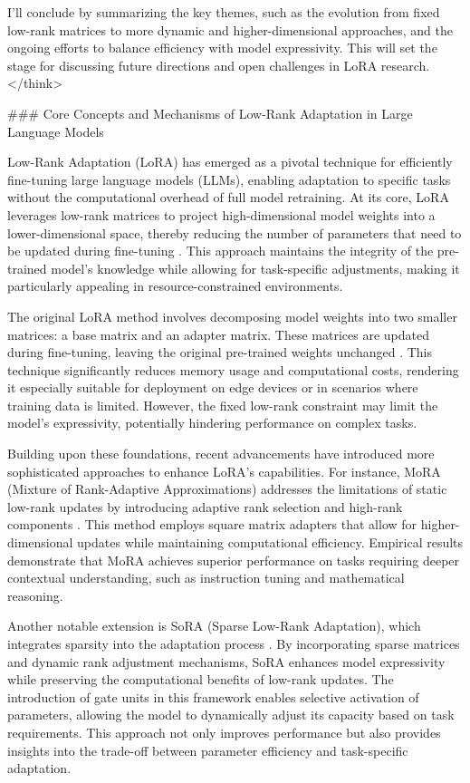 \documentclass[conference]{IEEEtran}
\begin{document}
I'll conclude by summarizing the key themes, such as the evolution from fixed low-rank matrices to more dynamic and higher-dimensional approaches, and the ongoing efforts to balance efficiency with model expressivity. This will set the stage for discussing future directions and open challenges in LoRA research.
</think>

### Core Concepts and Mechanisms of Low-Rank Adaptation in Large Language Models

Low-Rank Adaptation (LoRA) has emerged as a pivotal technique for efficiently fine-tuning large language models (LLMs), enabling adaptation to specific tasks without the computational overhead of full model retraining. At its core, LoRA leverages low-rank matrices to project high-dimensional model weights into a lower-dimensional space, thereby reducing the number of parameters that need to be updated during fine-tuning \cite{b1}. This approach maintains the integrity of the pre-trained model's knowledge while allowing for task-specific adjustments, making it particularly appealing in resource-constrained environments.

The original LoRA method involves decomposing model weights into two smaller matrices: a base matrix and an adapter matrix. These matrices are updated during fine-tuning, leaving the original pre-trained weights unchanged \cite{b2}. This technique significantly reduces memory usage and computational costs, rendering it especially suitable for deployment on edge devices or in scenarios where training data is limited. However, the fixed low-rank constraint may limit the model's expressivity, potentially hindering performance on complex tasks.

Building upon these foundations, recent advancements have introduced more sophisticated approaches to enhance LoRA's capabilities. For instance, MoRA (Mixture of Rank-Adaptive Approximations) addresses the limitations of static low-rank updates by introducing adaptive rank selection and high-rank components \cite{b3}. This method employs square matrix adapters that allow for higher-dimensional updates while maintaining computational efficiency. Empirical results demonstrate that MoRA achieves superior performance on tasks requiring deeper contextual understanding, such as instruction tuning and mathematical reasoning.

Another notable extension is SoRA (Sparse Low-Rank Adaptation), which integrates sparsity into the adaptation process \cite{b4}. By incorporating sparse matrices and dynamic rank adjustment mechanisms, SoRA enhances model expressivity while preserving the computational benefits of low-rank updates. The introduction of gate units in this framework enables selective activation of parameters, allowing the model to dynamically adjust its capacity based on task requirements. This approach not only improves performance but also provides insights into the trade-off between parameter efficiency and task-specific adaptation.
\end{document}
